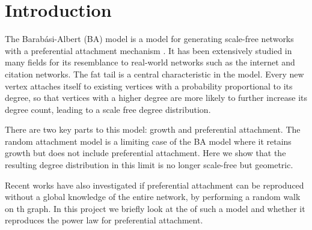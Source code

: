 \section{Introduction}\label{section:introduction}

The Barab\'asi-Albert (BA) model is a model for generating scale-free networks with a preferential attachment mechanism \citep{Barabasi1999}. It has been extensively studied in many fields for its resemblance to real-world networks such as the internet and citation networks. The fat tail is a central characteristic in the model. Every new vertex attaches itself to existing vertices with a probability proportional to its degree, so that vertices with a higher degree are more likely to further increase its degree count, leading to a scale free degree distribution. 

There are two key parts to this model: growth and preferential attachment. The random attachment model is a limiting case of the BA model where it retains growth but does not include preferential attachment. Here we show that the resulting degree distribution in this limit is no longer scale-free but geometric. 

Recent works \citep{Saramaki2004,Cannings2013,J.P.Saramaki2004} have also investigated if preferential attachment can be reproduced without a global knowledge of the entire network, by performing a random walk on th graph. In this project we briefly look at the of such a model and whether it reproduces the power law for preferential attachment. 